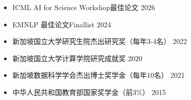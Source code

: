 \begin{itemize}
  \item ICML AI for Science Workshop最佳论文 \hfill 2026
  \item EMNLP 最佳论文Finallist \hfill 2024
  \item 新加坡国立大学研究生院杰出研究奖（每年3-4名） \hfill 2022
  \item 新加坡国立大学计算学院研究成就奖 \hfill 2020
  \item 新加坡数据科学学会杰出博士奖学金（每年10名） \hfill 2021
  \item 中华人民共和国教育部国家奖学金（前3\%） \hfill 2015
\end{itemize}
